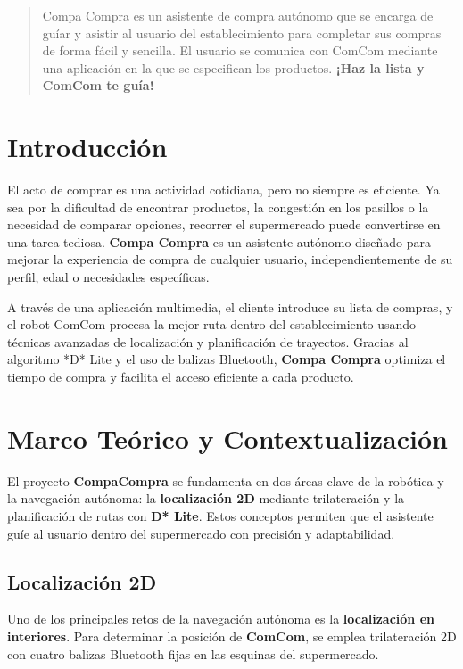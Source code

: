 \documentclass[a4paper,12pt]{article}
\begin{document}
\tableofcontents

\begin{abstract}
Compa Compra es un asistente de compra autónomo que se encarga de guíar y asistir al usuario del establecimiento para completar sus compras de forma fácil y sencilla. El usuario se comunica con ComCom mediante una aplicación en la que se especifican los productos.
\textbf{¡Haz la lista y ComCom te guía!}
\end{abstract}

\section{Introducción}
El acto de comprar es una actividad cotidiana, pero no siempre es eficiente. 
Ya sea por la dificultad de encontrar productos, la congestión en los 
pasillos o la necesidad de comparar opciones, recorrer el supermercado 
puede convertirse en una tarea tediosa. \textbf{ Compa Compra } es un asistente 
autónomo diseñado para mejorar la experiencia de compra de cualquier usuario, 
independientemente de su perfil, edad o necesidades específicas.  

A través de una aplicación multimedia, el cliente introduce su lista de 
compras, y el robot ComCom procesa la mejor ruta dentro del establecimiento 
usando técnicas avanzadas de localización y planificación de trayectos. 
Gracias al algoritmo *D* Lite y el uso de balizas Bluetooth, \textbf{ Compa Compra } 
optimiza el tiempo de compra y facilita el acceso eficiente a cada producto.  

\section{Marco Teórico y Contextualización}

El proyecto \textbf{CompaCompra} se fundamenta en dos áreas clave de la robótica y la navegación autónoma: la \textbf{localización 2D} mediante trilateración y la planificación de rutas con \textbf{D* Lite}. Estos conceptos permiten que el asistente guíe al usuario dentro del supermercado con precisión y adaptabilidad.

\subsection{Localización 2D}
Uno de los principales retos de la navegación autónoma es la \textbf{localización en interiores}. Para determinar la posición de \textbf{ComCom}, se emplea trilateración 2D con cuatro balizas Bluetooth fijas en las esquinas del supermercado.
\end{document}
